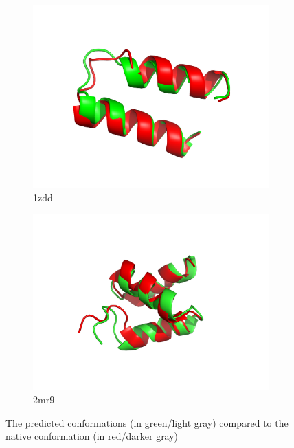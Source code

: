 \begin{figure}
\begin{subfigure}{0.32\linewidth}
    \centering
    \includegraphics[width=0.9\linewidth]{Figuras/prots/1zdd_render.png}
    \caption{1zdd}
    \label{fig:1zdd-conformation}
  \end{subfigure}
%
  \begin{subfigure}{0.32\linewidth}
    \centering
    \includegraphics[width=0.9\linewidth]{Figuras/prots/2mr9_render.png}
    \caption{2mr9}
    \label{fig:2mr9-conformation}
  \end{subfigure}
  \caption{The predicted conformations (in green/light gray) compared to the
  native conformation (in red/darker gray)}
  \label{fig:all-conformations}
\end{figure}
